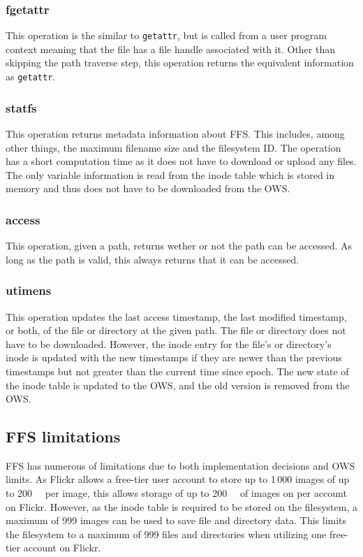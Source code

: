 \subsubsection{fgetattr}
This operation is the similar to \texttt{getattr}, but is called from a user program context meaning that the file has a file handle associated with it. Other than skipping the path traverse step, this operation returns the equivalent information as \texttt{getattr}.

\subsubsection{statfs}
This operation returns metadata information about FFS. This includes, among other things, the maximum filename size and the filesystem ID. The operation has a short computation time as it does not have to download or upload any files. The only variable information is read from the inode table which is stored in memory and thus does not have to be downloaded from the OWS.

\subsubsection{access}
This operation, given a path, returns wether or not the path can be accessed. As long as the path is valid, this always returns that it can be accessed.

\subsubsection{utimens}
This operation updates the last access timestamp, the last modified timestamp, or both, of the file or directory at the given path. The file or directory does not have to be downloaded. However, the inode entry for the file's or directory's inode is updated with the new timestamps if they are newer than the previous timestamps but not greater than the current time since epoch. The new state of the inode table is updated to the OWS, and the old version is removed from the OWS.


\subsection{FFS limitations}
\label{subsec:ffs_limits}
FFS has numerous of limitations due to both implementation decisions and OWS limits. As Flickr allows a free-tier user account to store up to 1\,000 images of up to \SI{200}{\mega\byte} per image, this allows storage of up to \SI{200}{\giga\byte} of images on per account on Flickr. However, as the inode table is required to be stored on the filesystem, a maximum of 999 images can be used to save file and directory data. This limits the filesystem to a maximum of 999 files and directories when utilizing one free-tier account on Flickr. 

